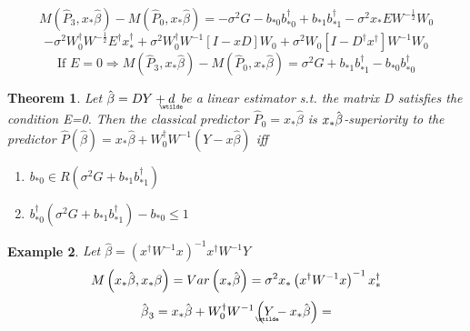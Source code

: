\documentclass{article}
\newtheorem{theorem}{Theorem}
\newtheorem{example}[theorem]{Example}
\begin{document}
\bigskip

\bigskip

\begin{equation*}
M\left( \hat{P}_{3},x_{\ast }\hat{\beta}\right) -M\left( \hat{P}_{0},x_{\ast
}\hat{\beta}\right) =-\sigma ^{2}G-b_{\ast 0}b_{\ast 0}^{\dagger }+b_{\ast
1}b_{\ast 1}^{\dagger }-\sigma ^{2}x_{\ast }EW^{-\frac{1}{2}}W_{0}
\end{equation*}%
\begin{equation*}
-\sigma ^{2}W_{0}^{\dagger }W^{-\frac{1}{2}}E^{\dagger }x_{\ast }^{\dagger
}+\sigma ^{2}W_{0}^{\dagger }W^{-1}\left[ I-xD\right] W_{0}+\sigma ^{2}W_{0}%
\left[ I-D^{\dagger }x^{\dagger }\right] W^{-1}W_{0}
\end{equation*}%
\begin{equation*}
\text{If }E=0\Rightarrow M\left( \hat{P}_{3},x_{\ast }\hat{\beta}\right)
-M\left( \hat{P}_{0},x_{\ast }\hat{\beta}\right) =\sigma ^{2}G+b_{\ast
1}b_{\ast 1}^{\dagger }-b_{\ast 0}b_{\ast 0}^{\dagger }
\end{equation*}

\bigskip

\begin{theorem}
Let $\hat{\beta}=DY+%
\underaccent{\wtilde}{d}%
$ be a linear estimator s.t. the matrix D satisfies the condition E=0. Then
the classical predictor $\hat{P}_{0}=x_{\ast }\hat{\beta}$ is $x_{\ast }\hat{%
\beta}$-superiority to the predictor $\hat{P}\left( \hat{\beta}\right)
=x_{\ast }\hat{\beta}+W_{0}^{\dagger }W^{-1}\left( Y-x\hat{\beta}\right) $
iff

\begin{enumerate}
\item b$_{\ast 0}\in R\left( \sigma ^{2}G+b_{\ast 1}b_{\ast 1}^{\dagger
}\right) $

\item b$_{\ast 0}^{\dagger }\left( \sigma ^{2}G+b_{\ast 1}b_{\ast
1}^{\dagger }\right) -b_{\ast 0}\leq 1$
\end{enumerate}
\end{theorem}

\bigskip

\begin{example}
Let $\hat{\beta}=\left( x^{\dagger }W^{-1}x\right) ^{-1}x^{\dagger }W^{-1}Y$%
\begin{equation*}
M\left( x_{\ast }\hat{\beta},x_{\ast }\beta \right) =Var\left( x_{\ast }\hat{%
\beta}\right) =\sigma ^{2}x_{\ast }\left( x^{\dagger }W^{-1}x\right)
^{-1}x_{\ast }^{\dagger }
\end{equation*}%
\begin{equation*}
\hat{\beta}_{3}=x_{\ast }\hat{\beta}+W_{0}^{\dagger }W^{-1}\left( 
\underaccent{\wtilde}{Y}%
-x_{\ast }\hat{\beta}\right) =
\end{equation*}
\end{example}
\end{document}
